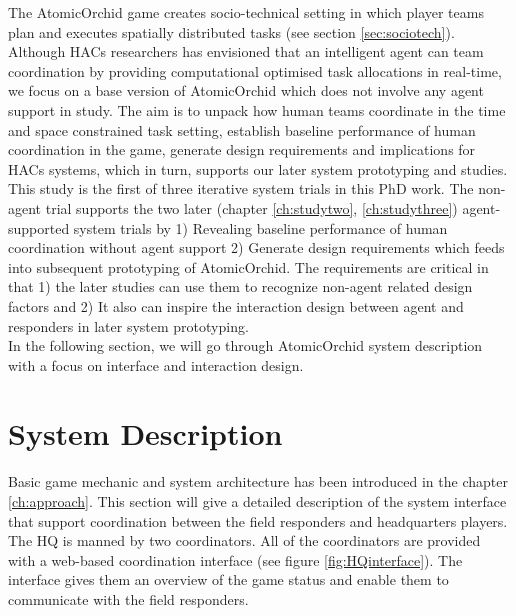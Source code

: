 The AtomicOrchid game creates socio-technical setting in which player teams plan and executes spatially distributed tasks (see section \ref{sec:sociotech}). Although HACs researchers has envisioned that an intelligent agent can team coordination by providing computational optimised task allocations in real-time, we focus on a base version of AtomicOrchid which does not involve any agent support in study. The aim is to unpack how human teams coordinate in the time and space constrained task setting, establish baseline performance of human coordination in the game, generate design requirements and implications for HACs systems, which in turn, supports our later system prototyping and studies. \\

This study is the first of three iterative system trials in this PhD work. The non-agent trial supports the two later (chapter \ref{ch:studytwo}, \ref{ch:studythree}) agent-supported system trials by 1) Revealing baseline performance of human coordination without agent support 2) Generate design requirements which feeds into subsequent prototyping of AtomicOrchid. The requirements are critical in that 1) the later studies can use them to recognize non-agent related design factors and 2) It also can inspire the interaction design between agent and responders in later system prototyping.  \\

In the following section, we will go through AtomicOrchid system description with a focus on interface and interaction design.\\

\section{System Description}\label{sec:system1}
Basic game mechanic and system architecture has been introduced in the chapter \ref{ch:approach}. This section will give a detailed description of the system interface that support coordination between the field responders and headquarters players. \\

The HQ is manned by two coordinators. All of the coordinators are provided with a web-based coordination interface (see figure \ref{fig:HQinterface}). The interface gives them an overview of the game status and enable them to communicate with the field responders. \\

